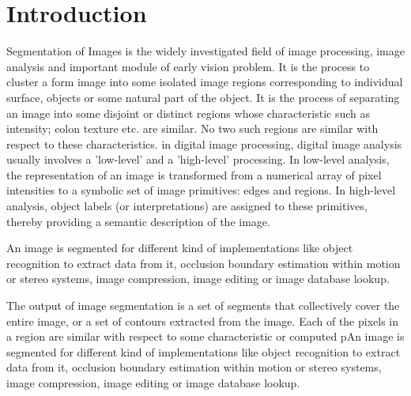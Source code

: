 \chapter{Introduction}
\label{intro}
Segmentation of Images \cite{Segmentation} is the widely investigated ﬁeld of image processing, image analysis and important module of early vision problem. It is the process to cluster a form image into some isolated image regions corresponding to individual surface, objects or some natural part of the object. It is the process of separating an image into some disjoint or distinct regions whose characteristic such as intensity; colon texture etc. are similar. No two such regions are similar with respect to these characteristics. in digital image processing, digital image analysis usually involves a 'low-level' and a 'high-level' processing. In low-level analysis, the representation of an image is transformed from a numerical array of pixel intensities to a symbolic set of image primitives: edges and regions. In high-level analysis, object labels (or interpretations) are assigned to these primitives, thereby providing a semantic description of the image.

An image is segmented \cite{Segmentation} for different kind of implementations like object recognition to extract data from it, occlusion boundary estimation within motion or stereo systems, image compression, image editing or image database lookup.

The output of image segmentation is a set of segments that collectively cover the entire image, or a set of contours extracted from the image. Each of the pixels in a region are similar with respect to some characteristic or computed pAn image is segmented for different kind of implementations like object recognition to extract data from it, occlusion boundary estimation within motion or stereo systems, image compression, image editing or image database lookup.

